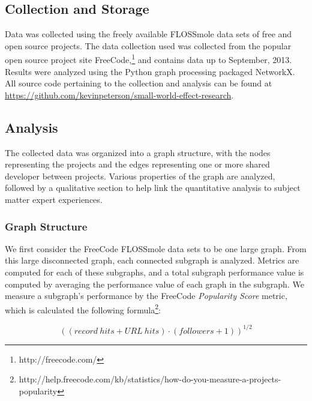 \documentclass{proc}
\begin{document}
\subsection{Collection and Storage}
Data was collected using the freely available FLOSSmole\cite{floss2006} data sets of free and open source projects. The data collection used was collected from the popular open source project site FreeCode,\footnote{http://freecode.com/} and contains data up to September, 2013. Results were analyzed using the Python graph processing packaged NetworkX\cite{hagberg-2008-exploring}. All source code pertaining to the collection and analysis can be found at \url{https://github.com/kevinpeterson/small-world-effect-research}.

\subsection{Analysis}
The collected data was organized into a graph structure, with the nodes representing the projects and the edges representing one or more shared developer between projects. Various properties of the graph are analyzed, followed by a qualitative section to help link the quantitative analysis to subject matter expert experiences.

\subsubsection{Graph Structure}
We first consider the FreeCode FLOSSmole\cite{floss2006} data sets to be one large graph. From this large disconnected graph, each connected subgraph is analyzed. Metrics are computed for each of these subgraphs, and a total subgraph performance value is computed by averaging the performance value of each graph in the subgraph. We measure a subgraph's performance by the FreeCode \textit{Popularity Score} metric, which is calculated the following formula\footnote{http://help.freecode.com/kb/statistics/how-do-you-measure-a-projects-popularity}:

\[ ((record\ hits + URL\ hits) \cdot (followers + 1))^{1/2} \]
\end{document}
